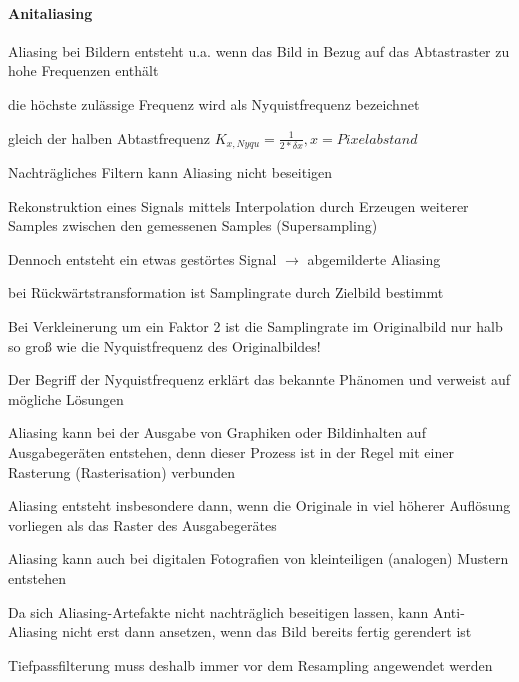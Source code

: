 \documentclass[landscape]{article}
\begin{document}
\begin{multicols}{3}
  \paragraph{Anitaliasing}
  \begin{itemize*}
    \item Aliasing bei Bildern entsteht u.a. wenn das Bild in Bezug auf das Abtastraster zu hohe Frequenzen enthält
    \item die höchste zulässige Frequenz wird als Nyquistfrequenz bezeichnet
    \begin{itemize*}
      \item gleich der halben Abtastfrequenz $K_{x,Nyqu}=\frac{1}{2*\delta x}, x = Pixelabstand$
      \item Nachträgliches Filtern kann Aliasing nicht beseitigen
    \end{itemize*}
    \item Rekonstruktion eines Signals mittels Interpolation durch Erzeugen weiterer Samples zwischen den gemessenen Samples (Supersampling)
    \item Dennoch entsteht ein etwas gestörtes Signal $\rightarrow$ abgemilderte Aliasing
    \item bei Rückwärtstransformation ist Samplingrate durch Zielbild bestimmt
    \item Bei Verkleinerung um ein Faktor 2 ist die Samplingrate im Originalbild nur halb so groß wie die Nyquistfrequenz des Originalbildes!
    \item Der Begriff der Nyquistfrequenz erklärt das bekannte Phänomen und verweist auf mögliche Lösungen
    \item Aliasing kann bei der Ausgabe von Graphiken oder Bildinhalten auf Ausgabegeräten entstehen, denn dieser Prozess ist in der Regel mit einer Rasterung (Rasterisation) verbunden
    \item Aliasing entsteht insbesondere dann, wenn die Originale in viel höherer Auflösung vorliegen als das Raster des Ausgabegerätes
    \item Aliasing kann auch bei digitalen Fotografien von kleinteiligen (analogen) Mustern entstehen
    \item Da sich Aliasing-Artefakte nicht nachträglich beseitigen lassen, kann Anti-Aliasing nicht erst dann ansetzen, wenn das Bild bereits fertig gerendert ist
    \item Tiefpassfilterung muss deshalb immer vor dem Resampling angewendet werden
  \end{itemize*}
  

\end{multicols}
\end{document}
